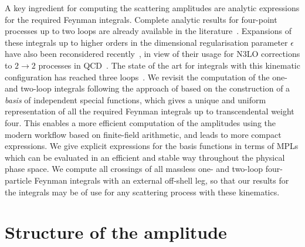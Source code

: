 \documentclass[main.tex]{subfiles}
\begin{document}
A key ingredient for computing the scattering amplitudes are analytic
expressions for the required Feynman integrals.  Complete analytic results for four-point processes up
to two loops are already available in the
literature~\cite{gehrmann:2000zt,gehrmann:2001ck,Gehrmann:2002zr}.  Expansions
of these integrals up to higher orders in the dimensional regularisation
parameter $\epsilon$ have also been reconsidered
recently~\cite{Gehrmann:2023etk}, in view of their usage for \ac{N3LO}
corrections to $2\to 2$ processes in
\ac{QCD}~\cite{Gehrmann:2022vuk,Gehrmann:2023zpz}.  The state of the art for
integrals with this kinematic configuration has reached three
loops~\cite{DiVita:2014pza,Canko:2020gqp,Canko:2021xmn,Henn:2023vbd}.  We
revisit the computation of the one- and two-loop integrals following the
approach of
based on the construction of a \emph{basis} of independent special functions,
which gives a unique and uniform representation of all the required Feynman
integrals up to transcendental weight four.  This enables a more efficient
computation of the amplitudes using the modern workflow based on finite-field
arithmetic, and leads to more compact expressions. We give explicit expressions
for the basis functions in terms of \acp{MPL} which can be evaluated in an
efficient and stable way throughout the physical phase space.  We compute all
crossings of all massless one- and two-loop four-particle Feynman integrals
with an external off-shell leg, so that our results for the integrals may be of
use for any scattering process with these kinematics.


\section{Structure of the amplitude}
\label{secQED:structure}
\end{document}
